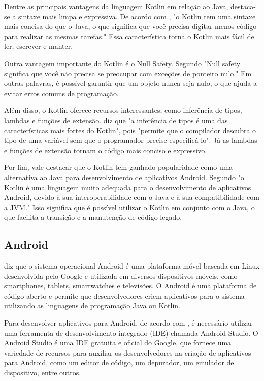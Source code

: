 \documentclass[12pt]{article}
\begin{document}
Dentre as principais vantagens da linguagem Kotlin em relação ao Java, destaca-se a sintaxe mais limpa e expressiva. De acordo com \cite{jemerov2017kotlin}, "o Kotlin tem uma sintaxe mais concisa do que o Java, o que significa que você precisa digitar menos código para realizar as mesmas tarefas." Essa característica torna o Kotlin mais fácil de ler, escrever e manter.

Outra vantagem importante do Kotlin é o Null Safety. Segundo \cite{leiva2019kotlin} "Null safety significa que você não precisa se preocupar com exceções de ponteiro nulo." Em outras palavras, é possível garantir que um objeto nunca seja nulo, o que ajuda a evitar erros comuns de programação.

Além disso, o Kotlin oferece recursos interessantes, como inferência de tipos, lambdas e funções de extensão.\cite{mccarthy2019kotlin} diz que "a inferência de tipos é uma das características mais fortes do Kotlin", pois "permite que o compilador descubra o tipo de uma variável sem que o programador precise especificá-lo". Já as lambdas e funções de extensão tornam o código mais conciso e expressivo.

Por fim, vale destacar que o Kotlin tem ganhado popularidade como uma alternativa ao Java para desenvolvimento de aplicativos Android. Segundo \cite{leiva2019kotlin} "o Kotlin é uma linguagem muito adequada para o desenvolvimento de aplicativos Android, devido à sua interoperabilidade com o Java e à sua compatibilidade com a JVM." Isso significa que é possível utilizar o Kotlin em conjunto com o Java, o que facilita a transição e a manutenção de código legado.

\subsection{Android}
\cite{gazzola2020desenvolvimento} diz que o sistema operacional Android é uma plataforma móvel baseada em Linux desenvolvida pelo Google e utilizada em diversos dispositivos móveis, como smartphones, tablets, smartwatches e televisões. O Android é uma plataforma de código aberto e permite que desenvolvedores criem aplicativos para o sistema utilizando as linguagens de programação Java ou Kotlin.

Para desenvolver aplicativos para Android, de acordo com \cite{sarkar2020android}, é necessário utilizar uma ferramenta de desenvolvimento integrado (IDE) chamada Android Studio. O Android Studio é uma IDE gratuita e oficial do Google, que fornece uma variedade de recursos para auxiliar os desenvolvedores na criação de aplicativos para Android, como um editor de código, um depurador, um emulador de dispositivo, entre outros.
\end{document}

